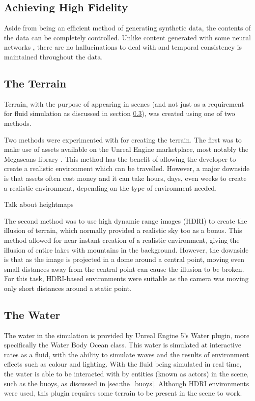 \documentclass[10pt,twocolumn,letterpaper]{article}
\begin{document}
\subsection{Achieving High Fidelity} \label {sec:achieving_high_fidelity}

Aside from being an efficient method of generating synthetic data, the contents of the data can be completely controlled. Unlike content generated with some neural networks \cite{richter2021enhancingphotorealismenhancement}, there are no hallucinations to deal with and temporal consistency is maintained throughout the data.

\subsection{The Terrain}

Terrain, with the purpose of appearing in scenes (and not just as a requirement for fluid simulation as discussed in section \ref{sec:the_water}), was created using one of two methods.

Two methods were experimented with for creating the terrain. The first was to make use of assets available on the Unreal Engine marketplace, most notably the Megascans library \cite{QuixelMegascans}. This method has the benefit of allowing the developer to create a realistic environment which can be travelled. However, a major downside is that assets often cost money and it can take hours, days, even weeks to create a realistic environment, depending on the type of environment needed.

Talk about heightmaps

The second method was to use high dynamic range images (HDRI) to create the illusion of terrain, which normally provided a realistic sky too as a bonus. This method allowed for near instant creation of a realistic environment, giving the illusion of entire lakes with mountains in the background. However, the downside is that as the image is projected in a dome around a central point, moving even small distances away from the central point can cause the illusion to be broken. For this task, HDRI-based environments were suitable as the camera was moving only short distances around a static point.

\subsection{The Water} \label {sec:the_water}

The water in the simulation is provided by Unreal Engine 5's Water plugin, more specifically the Water Body Ocean class. This water is simulated at interactive rates as a fluid, with the ability to simulate waves and the results of environment effects such as colour and lighting. With the fluid being simulated in real time, the water is able to be interacted with by entities (known as actors) in the scene, such as the buoys, as discussed in \ref{sec:the_buoys}. Although HDRI environments were used, this plugin requires some terrain to be present in the scene to work.
\end{document}
